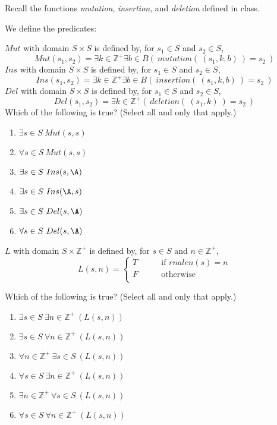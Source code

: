 
Recall the functions \textit{mutation}, \textit{insertion}, and \textit{deletion} defined in class.

We define the predicates:

$Mut$ with domain $S \times S$ is defined by, for $s_1 \in S$ and $s_2 \in S$,
\[
Mut(s_1,s_2) = \exists k\in \mathbb{Z^+} \exists b \in B (~ mutation(~(s_1, k, b)~) = s_2~)
\]
$Ins$ with domain $S \times S$ is defined by, for $s_1 \in S$ and $s_2 \in S$,
\[
Ins(s_1,s_2) = \exists k\in \mathbb{Z^+} \exists b \in B (~ insertion(~(s_1, k, b)~) = s_2~)
\]
$Del$ with domain $S \times S$ is defined by, for $s_1 \in S$ and $s_2 \in S$,
\[
Del(s_1,s_2) = \exists k\in \mathbb{Z^+} (~ deletion(~(s_1, k)~) = s_2~)
\]
Which of the following is true? (Select  all and only that apply.)
 \begin{enumerate}
    \item $\exists s \in S ~Mut(s,s)$
    \item $\forall s \in S ~Mut(s,s)$
    \item $\exists s \in S ~Ins(s,\A)$
    \item $\exists s \in S ~Ins(\A,s)$
    \item $\exists s \in S ~Del(s,\A)$
    \item $\forall s \in S ~Del(s,\A)$
 \end{enumerate} 

$L$ with domain $S \times \mathbb{Z}^+$ is defined by, for $s \in S$ and $n \in \mathbb{Z}^+$,
\[
L( s, n) = \begin{cases}
T &\qquad\text{if $rnalen(s) = n$}\\
F &\qquad\text{otherwise}\\
\end{cases}
\]

Which of the following is true? (Select  all and only that apply.)
\begin{enumerate}
   \item $\exists s \in S ~\exists n \in \mathbb{Z}^+ ~(L(s,n))$
   \item $\exists s \in S ~\forall n \in \mathbb{Z}^+ ~(L(s,n))$
   \item $\forall n \in \mathbb{Z}^+~\exists s \in S ~(L(s,n))$
   \item $\forall s \in S ~\exists n \in \mathbb{Z}^+ ~(L(s,n))$
   \item $\exists n \in \mathbb{Z}^+ ~\forall s \in S ~(L(s,n))$
   \item $\forall s \in S ~\forall n \in \mathbb{Z}^+ ~(L(s,n))$
\end{enumerate} 

